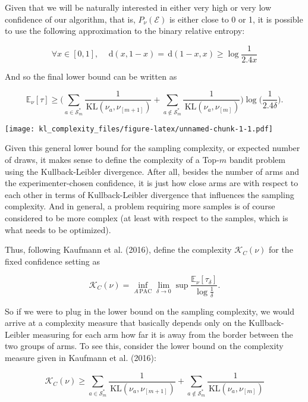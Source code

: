 \documentclass[12pt,]{article}
\newcommand{\KL}{\,\text{KL}}
\newcommand{\der}{\,\text{d}}
\begin{document}
Given that we will be naturally interested in either very high or very
low confidence of our algorithm, that is, \(P_\nu(\mathcal{E})\) is
either close to 0 or 1, it is possible to use the following
approximation to the binary relative entropy:

\begin{equation*}
\forall x \in [0,1], \quad \der(x,1-x) = \der(1-x,x) \geq \log \frac{1}{2.4x}
\end{equation*}

And so the final lower bound can be written as

\begin{equation*}
\mathbb{E}_{\nu}[\tau] \geq \Big( \sum_{a \in \mathcal{S}_m^*} \frac{1}{\KL(\nu_a, \nu_{[m+1]})} + \sum_{a \notin \mathcal{S}_m^*} \frac{1}{\KL(\nu_a, \nu_{[m]})} \Big) \log \big(\frac{1}{2.4\delta} \big).
\end{equation*}

\texttt{[image: kl\_complexity\_files/figure-latex/unnamed-chunk-1-1.pdf]}

Given this general lower bound for the sampling complexity, or expected
number of draws, it makes sense to define the complexity of a Top-\(m\)
bandit problem using the Kullback-Leibler divergence. After all, besides
the number of arms and the experimenter-chosen confidence, it is just
how close arms are with respect to each other in terms of
Kullback-Leibler divergence that influences the sampling complexity. And
in general, a problem requiring more samples is of course considered to
be more complex (at least with respect to the samples, which is what
needs to be optimized).

Thus, following Kaufmann et al. (2016), define the complexity
\(\mathcal{K}_C(\nu)\) for the fixed confidence setting as

\begin{equation}
\mathcal{K}_C(\nu) = \inf_{A \, \text{PAC}} \lim_{\delta \to 0} \sup \frac{\mathbb{E}_{\nu}[\tau_{\delta}]}{\log \frac{1}{\delta}}.
\end{equation}

So if we were to plug in the lower bound on the sampling complexity, we
would arrive at a complexity measure that basically depends only on the
Kullback-Leibler measuring for each arm how far it is away from the
border between the two groups of arms. To see this, consider the lower
bound on the complexity measure given in Kaufmann et al. (2016):

\begin{equation*}
\mathcal{K}_C(\nu) \geq \sum_{a \in \mathcal{S}_m^*} \frac{1}{\KL(\nu_a, \nu_{[m+1]})} + \sum_{a \notin \mathcal{S}_m^*} \frac{1}{\KL(\nu_a, \nu_{[m]})}
\end{equation*}
\end{document}
